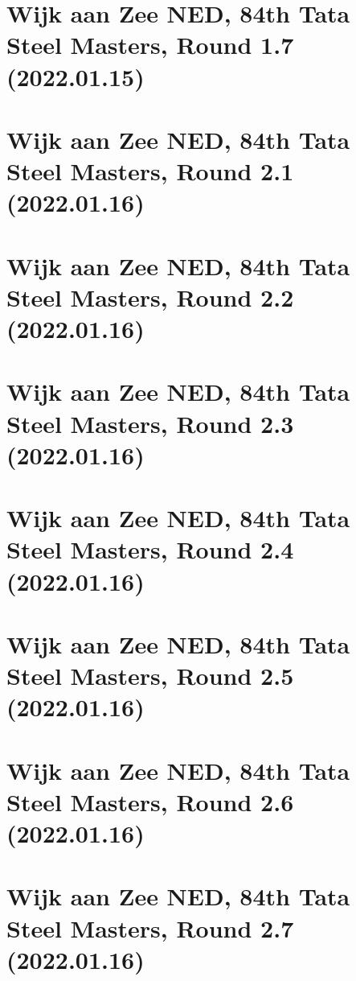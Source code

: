 \documentclass[11pt]{article}
\newcommand*\cleartoleftpage{%
   \clearpage
   \ifodd\value{page}\hbox{}\newpage\fi
}
\begin{document}
\cleartoleftpage

\section{Wijk aan Zee NED, 84th Tata Steel Masters, Round 1.7 (2022.01.15)}


\cleartoleftpage

\section{Wijk aan Zee NED, 84th Tata Steel Masters, Round 2.1 (2022.01.16)}


\cleartoleftpage

\section{Wijk aan Zee NED, 84th Tata Steel Masters, Round 2.2 (2022.01.16)}


\cleartoleftpage

\section{Wijk aan Zee NED, 84th Tata Steel Masters, Round 2.3 (2022.01.16)}


\cleartoleftpage

\section{Wijk aan Zee NED, 84th Tata Steel Masters, Round 2.4 (2022.01.16)}


\cleartoleftpage

\section{Wijk aan Zee NED, 84th Tata Steel Masters, Round 2.5 (2022.01.16)}


\cleartoleftpage

\section{Wijk aan Zee NED, 84th Tata Steel Masters, Round 2.6 (2022.01.16)}


\cleartoleftpage

\section{Wijk aan Zee NED, 84th Tata Steel Masters, Round 2.7 (2022.01.16)}

\end{document}
